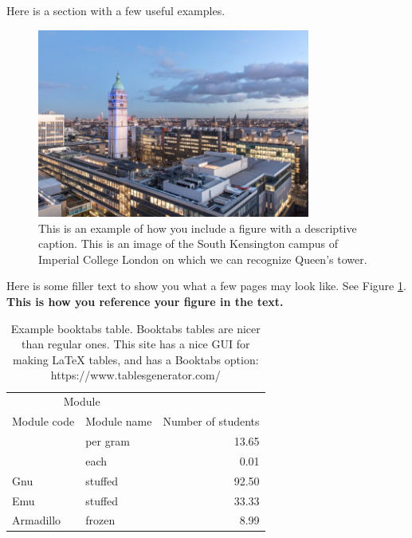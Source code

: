 \documentclass[a4paper,11pt, titlepage]{article}
\theoremstyle{definition}
\theoremstyle{plain}
\theoremstyle{remark}
\begin{document}
Here is a section with a few useful examples. 

\begin{figure}[b!] %
    \centering
    \includegraphics[width=0.8\textwidth]{figures/imperial.jpg}
    \caption{This is an example of how you include a figure with a descriptive caption. This is an image of the South Kensington campus of Imperial College London on which we can recognize Queen's tower.}
    \label{fig:imperial-picture}
\end{figure}

Here is some filler text to show you what a few pages may look like. \lipsum[2-4] See Figure \ref{fig:imperial-picture}. \textbf{This is how you reference your figure in the text.}

\begin{table}[]
    \centering
    \begin{tabular}{llr}  
        \toprule
        \multicolumn{2}{c}{Module} \\
        \cmidrule(r){1-2}
        Module code    & Module name & Number of students \\
        \midrule
              & per gram    & 13.65      \\
                      &    each     & 0.01       \\
        Gnu       & stuffed     & 92.50      \\
        Emu       & stuffed     & 33.33      \\
        Armadillo & frozen      & 8.99       \\
        \bottomrule
    \end{tabular}
    \caption{Example booktabs table. Booktabs tables are nicer than regular ones. This site has a nice GUI for making LaTeX tables, and has a Booktabs option: https://www.tablesgenerator.com/}
    \label{tab:my_label}
\end{table}
\end{document}
